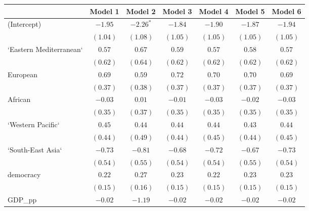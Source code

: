 
\begin{table}[!h]
\begin{center}
\begin{tabular}{l c c c c c c }
\toprule
 & Model 1 & Model 2 & Model 3 & Model 4 & Model 5 & Model 6 \\
\midrule
(Intercept)             & $-1.95$      & $-2.26^{*}$  & $-1.84$      & $-1.90$      & $-1.87$      & $-1.94$      \\
                        & $(1.04)$     & $(1.08)$     & $(1.05)$     & $(1.05)$     & $(1.05)$     & $(1.05)$     \\
`Eastern Mediterranean` & $0.57$       & $0.67$       & $0.59$       & $0.57$       & $0.58$       & $0.57$       \\
                        & $(0.62)$     & $(0.64)$     & $(0.62)$     & $(0.62)$     & $(0.62)$     & $(0.62)$     \\
European                & $0.69$       & $0.59$       & $0.72$       & $0.70$       & $0.70$       & $0.69$       \\
                        & $(0.37)$     & $(0.38)$     & $(0.37)$     & $(0.37)$     & $(0.37)$     & $(0.37)$     \\
African                 & $-0.03$      & $0.01$       & $-0.01$      & $-0.03$      & $-0.02$      & $-0.03$      \\
                        & $(0.35)$     & $(0.37)$     & $(0.35)$     & $(0.35)$     & $(0.35)$     & $(0.35)$     \\
`Western Pacific`       & $0.45$       & $0.44$       & $0.44$       & $0.44$       & $0.43$       & $0.44$       \\
                        & $(0.44)$     & $(0.49)$     & $(0.44)$     & $(0.45)$     & $(0.44)$     & $(0.45)$     \\
`South-East Asia`       & $-0.73$      & $-0.81$      & $-0.68$      & $-0.72$      & $-0.67$      & $-0.73$      \\
                        & $(0.54)$     & $(0.55)$     & $(0.54)$     & $(0.54)$     & $(0.55)$     & $(0.54)$     \\
democracy               & $0.22$       & $0.27$       & $0.23$       & $0.22$       & $0.23$       & $0.23$       \\
                        & $(0.15)$     & $(0.16)$     & $(0.15)$     & $(0.15)$     & $(0.15)$     & $(0.15)$     \\
GDP\_pp                 & $-0.02$      & $-1.19$      & $-0.02$      & $-0.02$      & $-0.02$      & $-0.02$      \\

\end{tabular}
\end{center}
\end{table}
